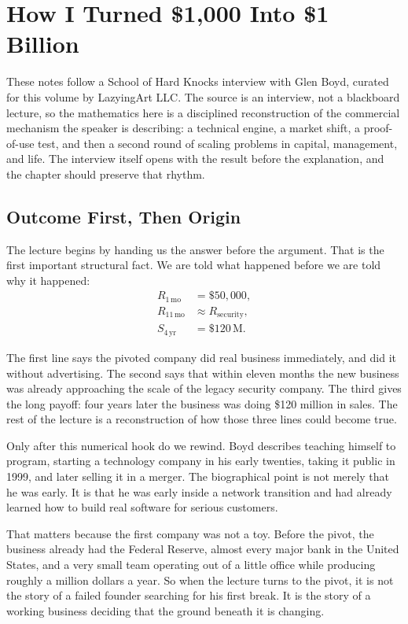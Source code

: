 \chapter{How I Turned \$1{,}000 Into \$1 Billion}

These notes follow a School of Hard Knocks interview with Glen Boyd, curated for this volume by LazyingArt LLC. The source is an interview, not a blackboard lecture, so the mathematics here is a disciplined reconstruction of the commercial mechanism the speaker is describing: a technical engine, a market shift, a proof-of-use test, and then a second round of scaling problems in capital, management, and life. The interview itself opens with the result before the explanation, and the chapter should preserve that rhythm.

\section{Outcome First, Then Origin}

The lecture begins by handing us the answer before the argument. That is the first important structural fact. We are told what happened before we are told why it happened:
\begin{align}
R_{1\,\mathrm{mo}} &= \$50{,}000,\\
R_{11\,\mathrm{mo}} &\approx R_{\mathrm{security}},\\
S_{4\,\mathrm{yr}} &= \$120\,\mathrm{M}.
\end{align}

The first line says the pivoted company did real business immediately, and did it without advertising. The second says that within eleven months the new business was already approaching the scale of the legacy security company. The third gives the long payoff: four years later the business was doing \$120 million in sales. The rest of the lecture is a reconstruction of how those three lines could become true.

Only after this numerical hook do we rewind. Boyd describes teaching himself to program, starting a technology company in his early twenties, taking it public in 1999, and later selling it in a merger. The biographical point is not merely that he was early. It is that he was early inside a network transition and had already learned how to build real software for serious customers.

That matters because the first company was not a toy. Before the pivot, the business already had the Federal Reserve, almost every major bank in the United States, and a very small team operating out of a little office while producing roughly a million dollars a year. So when the lecture turns to the pivot, it is not the story of a failed founder searching for his first break. It is the story of a working business deciding that the ground beneath it is changing.

